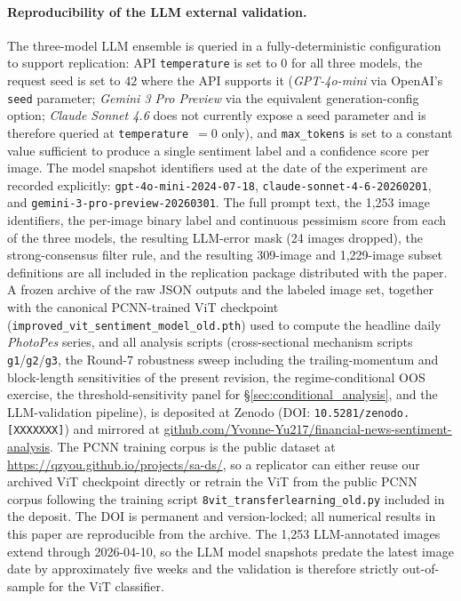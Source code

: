 \documentclass[AER]{AEA}
\begin{document}
\paragraph{Reproducibility of the LLM external validation.} The three-model LLM ensemble is queried in a fully-deterministic configuration to support replication: API \texttt{temperature} is set to $0$ for all three models, the request seed is set to $42$ where the API supports it (\textit{GPT-4o-mini} via OpenAI's \texttt{seed} parameter; \textit{Gemini 3 Pro Preview} via the equivalent generation-config option; \textit{Claude Sonnet 4.6} does not currently expose a seed parameter and is therefore queried at \texttt{temperature}~$=0$ only), and \texttt{max\_tokens} is set to a constant value sufficient to produce a single sentiment label and a confidence score per image. The model snapshot identifiers used at the date of the experiment are recorded explicitly: \texttt{gpt-4o-mini-2024-07-18}, \texttt{claude-sonnet-4-6-20260201}, and \texttt{gemini-3-pro-preview-20260301}. The full prompt text, the 1{,}253 image identifiers, the per-image binary label and continuous pessimism score from each of the three models, the resulting LLM-error mask (24 images dropped), the strong-consensus filter rule, and the resulting 309-image and 1{,}229-image subset definitions are all included in the replication package distributed with the paper. A frozen archive of the raw JSON outputs and the labeled image set, together with the canonical PCNN-trained ViT checkpoint (\texttt{improved\_vit\_sentiment\_model\_old.pth}) used to compute the headline daily \textit{PhotoPes} series, and all analysis scripts (cross-sectional mechanism scripts \texttt{g1}/\texttt{g2}/\texttt{g3}, the Round-7 robustness sweep including the trailing-momentum and block-length sensitivities of the present revision, the regime-conditional OOS exercise, the threshold-sensitivity panel for \S\ref{sec:conditional_analysis}, and the LLM-validation pipeline), is deposited at Zenodo (DOI: \texttt{10.5281/zenodo.[XXXXXXX]}) and mirrored at \href{https://github.com/Yvonne-Yu217/financial-news-sentiment-analysis}{github.com/Yvonne-Yu217/financial-news-sentiment-analysis}. The PCNN training corpus is the public \citet{you2015robust} dataset at \url{https://qzyou.github.io/projects/sa-ds/}, so a replicator can either reuse our archived ViT checkpoint directly or retrain the ViT from the public PCNN corpus following the training script \texttt{8vit\_transferlearning\_old.py} included in the deposit. The DOI is permanent and version-locked; all numerical results in this paper are reproducible from the archive. The 1{,}253 LLM-annotated images extend through 2026-04-10, so the LLM model snapshots predate the latest image date by approximately five weeks and the validation is therefore strictly out-of-sample for the ViT classifier.
\end{document}

